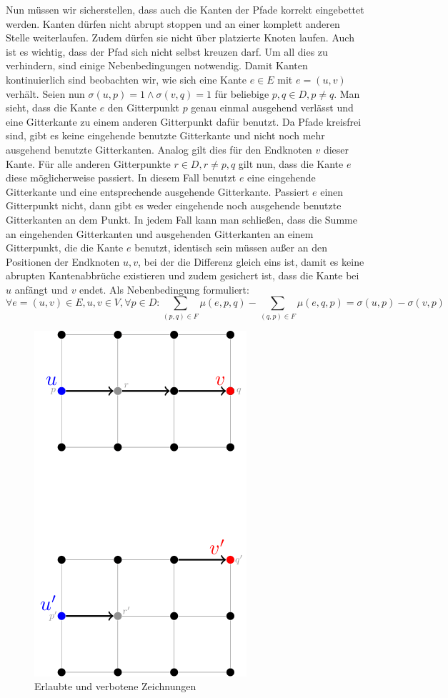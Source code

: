 \documentclass[bachelor, german]{algothesis}
\begin{document}
Nun müssen wir sicherstellen, dass auch die Kanten der Pfade korrekt eingebettet werden. Kanten dürfen nicht abrupt stoppen und an einer komplett anderen Stelle weiterlaufen. Zudem dürfen sie nicht über platzierte Knoten laufen. Auch ist es wichtig, dass der Pfad sich nicht selbst kreuzen darf. Um all dies zu verhindern, sind einige Nebenbedingungen notwendig. \newline
Damit Kanten kontinuierlich sind beobachten wir, wie sich eine Kante $e \in E$ mit $e = (u,v)$ verhält. Seien nun $\sigma(u,p) = 1 \land \sigma(v,q) = 1$ für beliebige $p,q \in D, p \neq q$. Man sieht, dass die Kante $e$ den Gitterpunkt $p$ genau einmal ausgehend verlässt und eine Gitterkante zu einem anderen Gitterpunkt dafür benutzt.  Da Pfade kreisfrei sind, gibt es keine eingehende benutzte Gitterkante und nicht noch mehr ausgehend benutzte Gitterkanten. Analog gilt dies für den Endknoten $v$ dieser Kante. Für alle anderen Gitterpunkte $r \in D, r \neq p,q$ gilt nun, dass die Kante $e$ diese möglicherweise passiert. In diesem Fall benutzt $e$ eine eingehende Gitterkante und eine entsprechende ausgehende Gitterkante. Passiert $e$ einen Gitterpunkt nicht, dann gibt es weder eingehende noch ausgehende benutzte Gitterkanten an dem Punkt. In jedem Fall kann man schließen, dass die Summe an eingehenden Gitterkanten und ausgehenden Gitterkanten an einem Gitterpunkt, die die Kante $e$ benutzt, identisch sein müssen außer an den Positionen der Endknoten $u,v$, bei der die Differenz gleich eins ist, damit es keine abrupten Kantenabbrüche existieren und zudem gesichert ist, dass die Kante bei $u$ anfängt und $v$ endet. Als Nebenbedingung formuliert: $$\forall e=(u,v) \in E, u,v \in V, \forall p \in D: \sum_{(p,q) \in F} \mu(e,p,q) - \sum_{(q,p) \in F} \mu(e,q,p) = \sigma(u,p) - \sigma(v,p)$$
\begin{figure}[H]
    \centering
    \includegraphics{figures/Kontinuierlich.png}
    \caption{Erlaubte und verbotene Zeichnungen}
    \label{fig:Kontinuierlich}
\end{figure}
\end{document}
